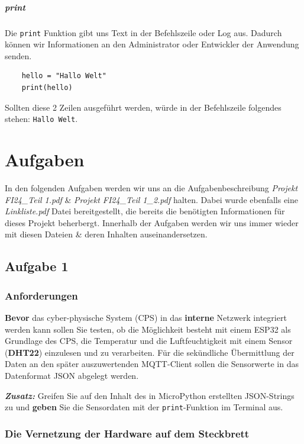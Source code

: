 \documentclass[9pt,a4paper]{report}
\begin{document}
	\subsubsection{print}
	Die \texttt{print} Funktion gibt uns Text in der Befehlszeile oder Log aus. Dadurch können wir Informationen an den Administrator oder Entwickler der Anwendung senden.
	\begin{lstlisting}
	hello = "Hallo Welt"
	print(hello)
	\end{lstlisting}
	Sollten diese 2 Zeilen ausgeführt werden, würde in der Befehlszeile folgendes stehen: \texttt{Hallo Welt}.
	
	\part{Aufgaben}
	In den folgenden Aufgaben werden wir uns an die Aufgabenbeschreibung \textit{Projekt FI24\_Teil 1.pdf} \& \textit{Projekt FI24\_Teil 1\_2.pdf} halten. Dabei wurde ebenfalls eine \textit{Linkliste.pdf} Datei bereitgestellt, die bereits die benötigten Informationen für dieses Projekt beherbergt.
	Innerhalb der Aufgaben werden wir uns immer wieder mit diesen Dateien \& deren Inhalten auseinandersetzen.
	
	
	\chapter{Aufgabe 1}
	\label{ch:aufgabe1}
	\section{Anforderungen}
	\textbf{Bevor} das cyber-physische System (CPS) in das \textbf{interne} Netzwerk integriert
	werden kann sollen Sie testen, ob die Möglichkeit besteht mit einem ESP32
	als Grundlage des CPS, die Temperatur und die Luftfeuchtigkeit mit einem
	Sensor (\textbf{DHT22}) einzulesen und zu verarbeiten. Für die sekündliche
	Übermittlung der Daten an den später auszuwertenden MQTT-Client sollen
	die Sensorwerte in das Datenformat JSON abgelegt werden.
	
	\textbf{\textit{Zusatz:}} Greifen Sie auf den Inhalt des in MicroPython erstellten JSON-Strings
	zu und \textbf{geben} Sie die Sensordaten mit der \texttt{print}-Funktion im Terminal aus.
	
	\section[Hardware]{Die Vernetzung der Hardware auf dem Steckbrett}
\end{document}
